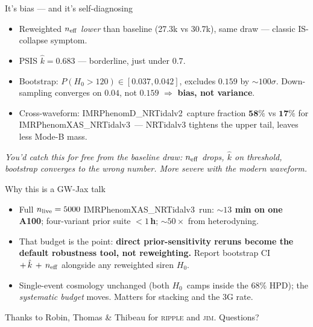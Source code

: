 \documentclass[aspectratio=169,10pt]{beamer}
\newcommand{\hzero}{\ensuremath{H_{0}}}
\newcommand{\IMRX}{IMRPhenomXAS\_NRTidalv3}
\newcommand{\IMR}{IMRPhenomD\_NRTidalv2}
\begin{document}
\begin{frame}{It's bias --- and it's self-diagnosing}
  \begin{itemize}
    \item Reweighted $n_{\rm eff}$ \emph{lower} than baseline (27.3k vs 30.7k), same draw --- classic IS-collapse symptom.
    \item PSIS $\hat{k}=0.683$ --- borderline, just under $0.7$.
    \item Bootstrap: $P(\hzero>120)\in[0.037,0.042]$, excludes $0.159$ by ${\sim}100\sigma$. Down-sampling converges on $0.04$, not $0.159$ $\Rightarrow$ \textbf{bias, not variance}.
    \item Cross-waveform: \IMR\ capture fraction $\mathbf{58\%}$ vs $\mathbf{17\%}$ for \IMRX\ --- NRTidalv3 tightens the upper tail, leaves less Mode-B mass.
  \end{itemize}
  \vfill
  \footnotesize\textit{You'd catch this for free from the baseline draw: $n_{\rm eff}$ drops, $\hat{k}$ on threshold, bootstrap converges to the wrong number. More severe with the modern waveform.}
\end{frame}

\begin{frame}{Why this is a GW-Jax talk}
  \begin{itemize}
    \item Full $n_{\rm live}=5000$ \IMRX\ run: \textbf{${\sim}13$ min on one A100}; four-variant prior suite \textbf{$<1$\,h}; ${\sim}50\times$ from heterodyning.
    \item That budget is the point: \textbf{direct prior-sensitivity reruns become the default robustness tool, not reweighting.} Report bootstrap CI $+\,\hat{k}\,+\,n_{\rm eff}$ alongside any reweighted siren \hzero.
    \item Single-event cosmology unchanged (both \hzero\ camps inside the 68\% HPD); the \emph{systematic budget} moves. Matters for stacking and the 3G rate.
  \end{itemize}
  \vfill
  \centering\small Thanks to Robin, Thomas \& Thibeau for \textsc{ripple} and \textsc{jim}. \quad Questions?
\end{frame}
\end{document}

